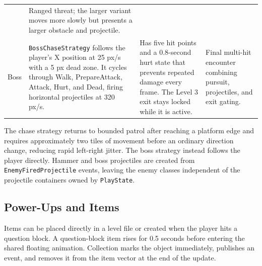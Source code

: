 \documentclass{template}
\begin{document}
\begin{table}[htbp]
\begin{tabularx}{\textwidth}{@{}p{2.25cm}XXX@{}}
        & Ranged threat; the larger variant moves more slowly but presents a
        larger obstacle and projectile. \\
        Boss & \texttt{BossChaseStrategy} follows the player's X position at
        25 px/s with a 5 px dead zone. It cycles through Walk, PrepareAttack,
        Attack, Hurt, and Dead, firing horizontal projectiles at 320 px/s. & Has
        five hit points and a 0.8-second hurt state that prevents repeated
        damage every frame. The Level 3 exit stays locked while it is active. &
        Final multi-hit encounter combining pursuit, projectiles, and exit
        gating. \\
        \bottomrule
    \end{tabularx}
\end{table}

The chase strategy returns to bounded patrol after reaching a platform edge
and requires approximately two tiles of movement before an ordinary direction
change, reducing rapid left-right jitter. The boss strategy instead follows
the player directly. Hammer and boss projectiles are created from
\texttt{EnemyFiredProjectile} events, leaving the enemy classes independent of
the projectile containers owned by \texttt{PlayState}.

\subsection{Power-Ups and Items}

Items can be placed directly in a level file or created when the player hits a
question block. A question-block item rises for 0.5 seconds before entering the
shared floating animation. Collection marks the object immediately, publishes
an event, and removes it from the item vector at the end of the update.
\end{document}

